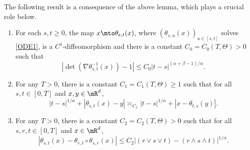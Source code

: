 The following result is a consequence of the above lemma, which plays a crucial role below.
\skpt
\begin{lemma}\label{Le22}
\begin{enumerate}
\item\label{Le22i}
For each $s,t\geq 0$, the map $x\mto \theta_{s,t}(x)$, where $(\theta_{s,u}(x))_{u\in [s,t]}$ solves \eqref{ODE1},
is a $C^1$-diffeomorphism and there is a constant $C_0=C_0(T,\Theta)>0$
such that
\[
|\det(\nabla\theta^{-1}_{s,t}(x))-1|\le C_0|t-s|^{(\alpha+\beta-1)/\alpha}.
\]
\item\label{Le22ii}
For any $T>0$, there is a constant $C_1=C_1(T,\Theta)\geq 1$
such that for all $s,t\in[0,T]$ and $x,y\in\mR^d$,
\begin{equation}\label{KH2}
|t-s|^{1/\alpha}+|\theta_{s,t}(x)-y|\asymp_{C_1}|t-s|^{1/\alpha}+|x-\theta_{t,s}(y)|.
\end{equation}
\item\label{Le22iii}
For any $T>0$, there is a constant $C_2=C_2(T,\Theta)>0$ such that for all $s,r,t\in[0,T]$ and $x\in\mR^d$,
\begin{equation}\label{KH1}
|\theta_{s,t}(x)-\theta_{r,t}\circ\theta_{s,r}(x)|\le C_2 |(r\vee s\vee t)-(r\wedge s\wedge t)|^{1/\alpha}.
\end{equation}
\end{enumerate}
\end{lemma}
\skpt
